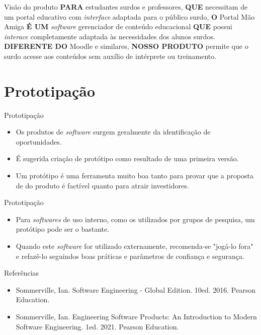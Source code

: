 \documentclass[11pt]{beamer}
\begin{document}
   \begin{frame}{Visão do produto}
      \textbf{PARA} estudantes surdos e professores, \textbf{QUE} necessitam de um portal educativo com \textit{interface} adaptada para o público surdo, \textbf{O} Portal Mão Amiga \textbf{É UM} \textit{software} gerenciador de conteúdo educacional \textbf{QUE} possui \textit{interace} completamente adaptada às necessidades dos alunos surdos. \textbf{DIFERENTE DO} Moodle e similares, \textbf{NOSSO PRODUTO} permite que o surdo acesse aos conteúdos sem auxílio de intérprete ou treinamento.
   \end{frame}

   \section{Prototipação}

   \begin{frame}{Prototipação}
      \begin{itemize}
         \item Os produtos de \textit{software} surgem geralmente da identificação de oportunidades.
         \item É sugerida criação de protótipo como resultado de uma primeira versão.
         \item Um protótipo é uma ferramenta muito boa tanto para provar que a proposta de do produto é factível quanto para atrair investidores.
      \end{itemize}
   \end{frame}

   \begin{frame}{Prototipação}
      \begin{itemize}
         \item Para \textit{softwares} de uso interno, como os utilizados por grupos de pesquisa, um protótipo pode ser o bastante.
         \item Quando este \textit{software} for utilizado externamente, recomenda-se "jogá-lo fora" e refazê-lo seguindos boas práticas e parâmetros de confiança e segurança.
      \end{itemize}
   \end{frame}

   \begin{frame}{Referências}
      \begin{itemize}
          \item Sommerville, Ian. Software Engineering - Global Edition. 10ed. 2016. Pearson Education.
          \item Sommerville, Ian. Engineering Software Products: An Introduction to Modern Software Engineering. 1ed. 2021. Pearson Education. 
      \end{itemize}
   \end{frame}
\end{document}
